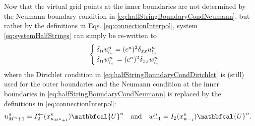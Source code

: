 Now that the virtual grid points at the inner boundaries are not determined by the Neumann boundary condition in \eqref{eq:halfStringBoundaryCondNeumann}, but rather by the definitions in Eqs. \eqref{eq:connectionInterpol}, system \eqref{eq:systemHalfStrings} can simply be re-written to
\begin{equation}\label{eq:FDSwithMethod}
    \begin{cases}
        \delta_{tt}u_{l_u}^n = (c^n)^2\delta_{xx}u_{l_u}^n\\
        \delta_{tt}w_{l_w}^n = (c^n)^2\delta_{xx}w_{l_w}^n
    \end{cases}
\end{equation}
where the Dirichlet condition in \eqref{eq:halfStringBoundaryCondDirichlet} is (still) used for the outer boundaries and the Neumann condition at the inner boundaries in \eqref{eq:halfStringBoundaryCondNeumann} is replaced by the definitions in \eqref{eq:connectionInterpol}:
\begin{equation}
        \!\!u_{M^n+1}^n = I_2^\flip(x_{u_{M^n+1}}^n)\mathbfcal{U}^n \quad \text{and}\quad w_{-1}^n = I_2(x_{w_{-1}}^n)\mathbfcal{U}^n.
\end{equation}

